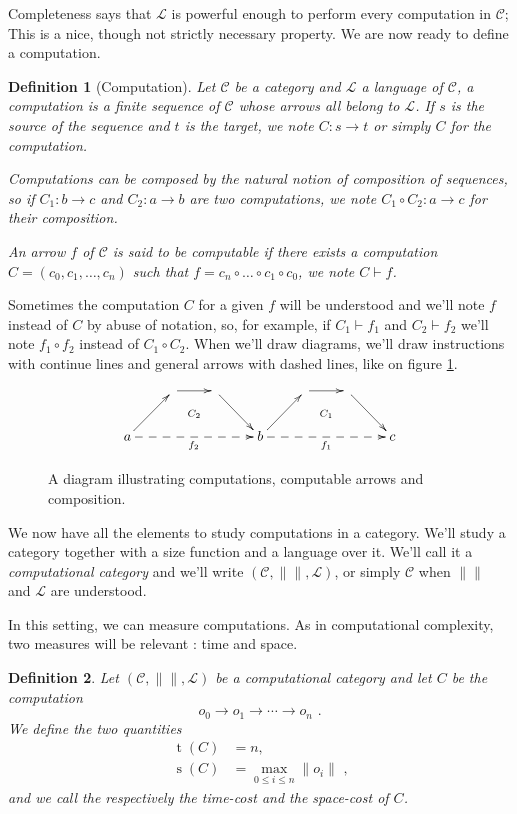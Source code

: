\documentclass{article}
\newcommand{\cat}[1]{\mathscr{#1}}
\newcommand{\C}{\cat{C}}
\renewcommand{\L}{\cat{L}}
\newcommand{\comp}{\circ}
\newcommand{\size}[1]{\lVert#1\rVert}
\newcommand{\ra}{\rightarrow}
\DeclareMathOperator{\Time}{t}
\DeclareMathOperator{\Space}{s}
\newcommand{\computes}{\vdash}
\newtheorem{definition}{Definition}
\begin{document}
  Completeness says that $\L$ is powerful enough to perform every
  computation in $\C$; This is a nice, though not strictly necessary
  property. We are now ready to define a computation.

  \begin{definition}[Computation]
    Let $\C$ be a category and $\L$ a language of $\C$, a
    \emph{computation} is a finite sequence of $\C$ whose arrows all
    belong to $\L$. If $s$ is the source of the sequence and $t$ is
    the target, we note $C:s\ra t$ or simply $C$ for the
    computation.
    
    Computations can be composed by the natural notion of composition
    of sequences, so if $C_1 : b\ra c$ and $C_2 : a\ra b$ are two
    computations, we note $C_1\comp C_2 : a\ra c$ for their
    composition.

    An arrow $f$ of $\C$ is said to be \emph{computable} if there
    exists a computation $C = (c_0, c_1,\ldots,c_n)$ such that $f =
    c_n\comp\ldots\comp c_1\comp c_0$, we note $C\computes f$.
  \end{definition}

  Sometimes the computation $C$ for a given $f$ will be understood and
  we'll note $f$ instead of $C$ by abuse of notation, so, for example,
  if $C_1\computes f_1$ and $C_2\computes f_2$ we'll note $f_1\comp
  f_2$ instead of $C_1\comp C_2$. When we'll draw diagrams, we'll draw
  instructions with continue lines and general arrows with dashed
  lines, like on figure \ref{fig:comp}.
  \begin{figure}[!h]
    \[\xymatrix{
      & \ar[r]\ar@{}[dr]|{C_2} & \ar[dr] &
      & \ar[r]\ar@{}[dr]|{C_1} & \ar[dr] \\
      a \ar[ur]\ar@{-->}[rrr]_{f_2} &&& b
      \ar[ur]\ar@{-->}[rrr]_{f_1} &&& c
    }\]
    \caption{\label{fig:comp}A diagram illustrating computations,
    computable arrows and composition.}
  \end{figure}
  
  We now have all the elements to study computations in a
  category. We'll study a category together with a size function and a
  language over it. We'll call it a \emph{computational category} and
  we'll write $(\C, \size{}, \L)$, or simply $\C$ when $\size{}$ and
  $\L$ are understood.

  In this setting, we can measure computations. As in computational
  complexity, two measures will be relevant : time and space.

  \begin{definition}
    Let $(\C, \size{}, \L)$ be a computational category and let $C$ be
    the computation
    \[o_0 \ra o_1 \ra \cdots \ra o_n \text{ .}\]
    We define the two quantities
    \begin{align*}
      \Time(C) &= n \text{,} \\
      \Space(C) &= \max_{0\le i \le n} \size{o_i} \text{ ,}
    \end{align*}
    and we call the respectively the \emph{time-cost} and the
    \emph{space-cost} of $C$.
  \end{definition}
\end{document}
